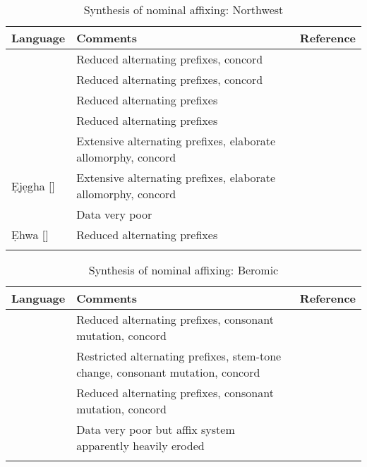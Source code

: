 \documentclass[output=paper]{langsci/langscibook}
\begin{document}
\begin{table}
\small
\caption{Synthesis of nominal affixing: Northwest}
\label{tab:nomaffplat:1}
\begin{tabularx}{\textwidth}{lQl}
\lsptoprule 
  Language 	& Comments 	&   Reference\\
\midrule
{} 	& Reduced alternating prefixes, concord 	& \\\
\tablevspace
{} 	& Reduced alternating prefixes, concord 	&  \\ 
\tablevspace
{} 	& Reduced alternating prefixes 	& \\
\tablevspace
{} 	& Reduced alternating prefixes 	& \\
\tablevspace
{} 	& Extensive alternating prefixes, elaborate allomorphy, concord 	& \citet{Seitz1993}\\
\tablevspace
Ẹjẹgha [] 	& Extensive alternating prefixes, elaborate allomorphy, concord 	& \\
\tablevspace
{} 	& Data very poor 	& \\
\tablevspace
Ẹhwa [] 	& Reduced alternating prefixes 	& \\
\lspbottomrule
\end{tabularx}
\end{table}

\begin{table}
\caption{Synthesis of nominal affixing: Beromic}
\small
\begin{tabularx}{\textwidth}{lQl}
\lsptoprule
Language 	& Comments 	&   Reference\\
\midrule
{} 	& Reduced alternating prefixes, consonant mutation, concord 	& \citet{Wolff1963}\newline\citet{Bouquiaux1970}\\
\tablevspace
{}  	& Restricted alternating prefixes, stem-tone change, consonant mutation, concord \\
\tablevspace
{}  	& Reduced alternating prefixes, consonant mutation, concord 	& \citet{Bouquiaux1964}\\
\tablevspace
{} 	& Data very poor but affix system apparently heavily eroded 	& \\
\lspbottomrule
\end{tabularx}
\end{table}
\end{document}
